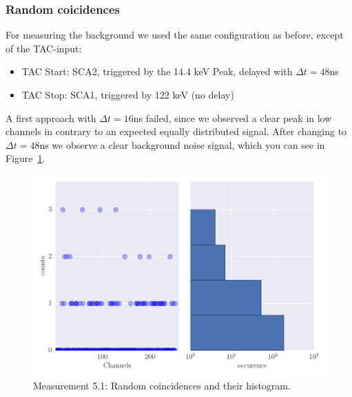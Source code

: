 \subsubsection{Random coicidences}
\label{ssub:Random coicidences}
For measuring the background we used the same configuration as before, except of the TAC-input:
\begin{itemize}
    \item TAC Start: SCA2, triggered by the 14.4 keV Peak, delayed with $\Delta t = 48$ns
    \item TAC Stop: SCA1, triggered by 122 keV (no delay)
\end{itemize}
A first approach with $\Delta t = 16$ns failed, since we observed a clear peak in low channels in contrary
to an expected equally distributed signal. After changing to $\Delta t=48$ns we observe a clear
background noise signal, which you can see in Figure~\ref{fig:5_1}.
\begin{figure}[htpb]
    \centering
    \includegraphics[width=1.0\linewidth]{analysis/figures/plot5_1_hist}
    \caption{Measurement 5.1: Random coincidences and their histogram.}
    \label{fig:5_1}
\end{figure}
\clearpage

